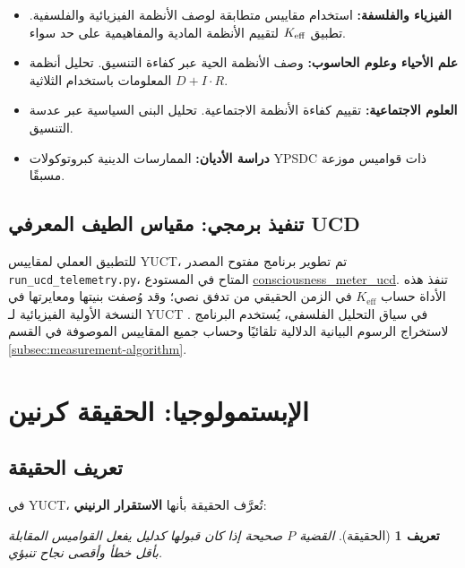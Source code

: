 \documentclass[11pt,a4paper]{article}
\newtheorem{definition}{تعريف}[section]
\begin{document}
	\begin{itemize}
		\item \textbf{الفيزياء والفلسفة:} استخدام مقاييس متطابقة لوصف الأنظمة الفيزيائية والفلسفية. تطبيق \(\Keff\) لتقييم الأنظمة المادية والمفاهيمية على حد سواء.
		\item \textbf{علم الأحياء وعلوم الحاسوب:} وصف الأنظمة الحية عبر كفاءة التنسيق. تحليل أنظمة المعلومات باستخدام الثلاثية \(D + I \cdot R\).
		\item \textbf{العلوم الاجتماعية:} تقييم كفاءة الأنظمة الاجتماعية. تحليل البنى السياسية عبر عدسة التنسيق.
		\item \textbf{دراسة الأديان:} الممارسات الدينية كبروتوكولات YPSDC ذات قواميس موزعة مسبقًا.
	\end{itemize}
	
	\subsection{تنفيذ برمجي: مقياس الطيف المعرفي UCD}
	\label{subsec:ucd-software}
	
	للتطبيق العملي لمقاييس YUCT، تم تطوير برنامج مفتوح المصدر \texttt{run\_ucd\_telemetry.py}، المتاح في المستودع \href{https://github.com/Alexey-Yakushev-YUCT/consciousness_meter_ucd}{consciousness\_meter\_ucd}. تنفذ هذه الأداة حساب \(K_{\mathrm{eff}}\) في الزمن الحقيقي من تدفق نصي؛ وقد وُصفت بنيتها ومعايرتها في النسخة الأولية الفيزيائية لـ YUCT \cite{Yakushev2026b}. في سياق التحليل الفلسفي، يُستخدم البرنامج لاستخراج الرسوم البيانية الدلالية تلقائيًا وحساب جميع المقاييس الموصوفة في القسم \ref{subsec:measurement-algorithm}.
	
	
	\section{الإبستمولوجيا: الحقيقة كرنين}
	
	\subsection{تعريف الحقيقة}
	
	في YUCT، تُعرَّف الحقيقة بأنها \textbf{الاستقرار الرنيني}:
	
	\begin{definition}[الحقيقة]
		القضية \(P\) صحيحة إذا كان قبولها كدليل يفعل القواميس المقابلة بأقل خطأ وأقصى نجاح تنبؤي.
	\end{definition}
	
\end{document}
